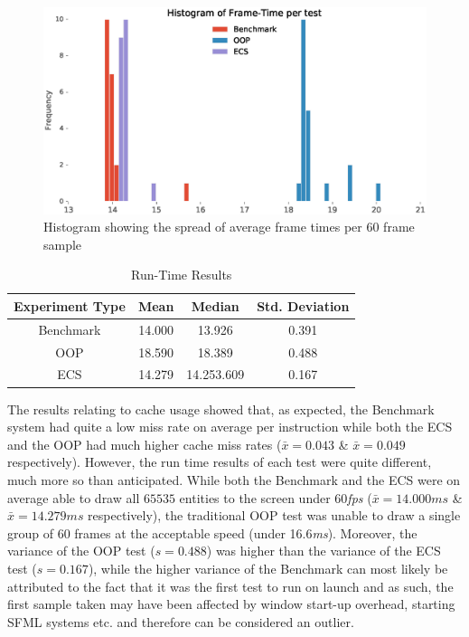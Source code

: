 \documentclass[10pt]{scrartcl}
\begin{document}
	\begin{figure}[H]
		\centering
		\includegraphics[width=\textwidth]{profiling/hist.eps}
		\caption{Histogram showing the spread of average frame times per 60 frame sample}
		\label{fig:frame_hist}
	\end{figure}

	\begin{table}[H]
		\centering
		\begin{tabular}{|c|c|c|c|}
			\hline
			Experiment Type & Mean & Median & Std. Deviation \\
			\hline
			Benchmark & 14.000 & 13.926 & 0.391 \\
			OOP & 18.590 & 18.389 & 0.488 \\
			ECS & 14.279 & 14.253.609 & 0.167 \\
			\hline
		\end{tabular}
		\caption{Run-Time Results}
		\label{fig:stats}
	\end{table}

The results relating to cache usage showed that, as expected, the Benchmark system had quite a low miss rate on average per instruction while both the ECS and the OOP had much higher cache miss rates ($\bar{x}=0.043$ \& $\bar{x}=0.049$ respectively). However, the run time results of each test were quite different, much more so than anticipated. While both the Benchmark and the ECS were on average able to draw all $65535$ entities to the screen under 60\textit{fps} ($\bar{x}=14.000\mathit{ms}$ \& $\bar{x}=14.279\mathit{ms}$ respectively), the traditional OOP test was unable to draw a single group of 60 frames at the acceptable speed (under 16.6\textit{ms}). Moreover, the variance of the OOP test ($s=0.488$) was higher than the variance of the ECS test ($s=0.167$), while the higher variance of the Benchmark can most likely be attributed to the fact that it was the first test to run on launch and as such, the first sample taken may have been affected by window start-up overhead, starting SFML systems etc. and therefore can be considered an outlier.
\end{document}
